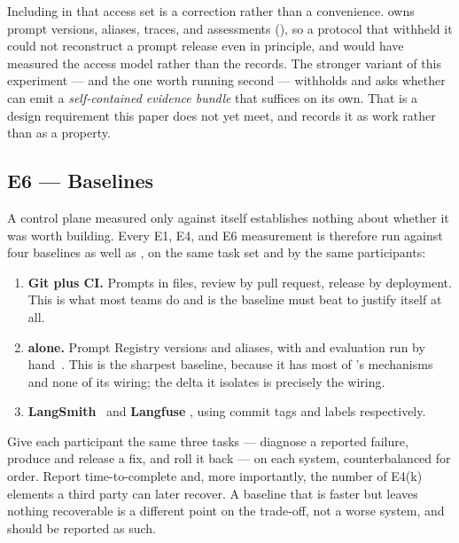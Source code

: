Including \mlflow{} in that access set is a correction rather than a convenience.
\mlflow{} owns prompt versions, aliases, traces, and assessments
(), so a protocol that withheld it could not reconstruct a
prompt release even in principle, and would have measured the access model rather
than the records. The stronger variant of this experiment --- and the one worth
running second --- withholds \mlflow{} and asks whether \sys can emit a
\emph{self-contained evidence bundle} that suffices on its own. That is a design
requirement this paper does not yet meet, and  records it as
work rather than as a property.

\subsection{E6 --- Baselines}

A control plane measured only against itself establishes nothing about whether it
was worth building. Every E1, E4, and E6 measurement is therefore run against four
baselines as well as \sys, on the same task set and by the same participants:

\begin{enumerate}
\item \textbf{Git plus CI.} Prompts in files, review by pull request, release by
      deployment. This is what most teams do and is the baseline \sys must beat to
      justify itself at all.
\item \textbf{\mlflow{} alone.} Prompt Registry versions and aliases, with
       and evaluation run by
      hand~\cite{mlflowpromptregistry,mlflowoptimize}. This is the sharpest
      baseline, because it has most of \sys's mechanisms and none of its wiring;
      the delta it isolates is precisely the wiring.
\item \textbf{LangSmith}~\cite{langsmithprompts} and \textbf{Langfuse}
      \cite{langfuseprompts}, using commit tags and labels respectively.
\end{enumerate}

 Give each participant the same three
tasks --- diagnose a reported failure, produce and release a fix, and roll it back
--- on each system, counterbalanced for order. Report time-to-complete and, more
importantly, the number of E4(k) elements a third party can later recover. A
baseline that is faster but leaves nothing recoverable is a different point on the
trade-off, not a worse system, and should be reported as such.

